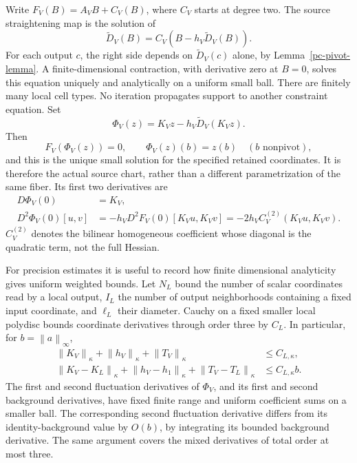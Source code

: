 \documentclass[11pt]{article}
\newcommand{\norm}[1]{\left\|#1\right\|}
\begin{document}
Write $F_V(B)=A_VB+C_V(B)$, where $C_V$ starts at degree two.
The source straightening map is the solution of
\begin{equation}\label{pc-straightening}
 \widetilde D_V(B)=C_V(B-h_V\widetilde D_V(B)).
\end{equation}
For each output $c$, the right side depends on
$\widetilde D_V(c)$ alone, by Lemma~\ref{pc-pivot-lemma}.
A finite-dimensional contraction, with derivative zero at
$B=0$, solves this equation uniquely and analytically on a
uniform small ball. There are finitely many local cell types.
No iteration propagates support to another constraint equation.
Set
\begin{equation}\label{pc-exact-chart}
 \Phi_V(z)=K_Vz-h_V\widetilde D_V(K_Vz).
\end{equation}
Then
\begin{equation}\label{pc-chart-identities}
 F_V(\Phi_V(z))=0,\qquad
 \Phi_V(z)(b)=z(b)\quad(b\text{ nonpivot}),
\end{equation}
and this is the unique small solution for the specified retained
coordinates. It is therefore the actual source chart, rather
than a different parametrization of the same fiber. Its first
two derivatives are
\begin{equation}\label{pc-chart-derivatives}
 \begin{split}
 D\Phi_V(0)&=K_V,\\
 D^2\Phi_V(0)[u,v]
   &=-h_VD^2F_V(0)[K_Vu,K_Vv]
    =-2h_VC_V^{(2)}(K_Vu,K_Vv).
 \end{split}
\end{equation}
$C_V^{(2)}$ denotes the bilinear homogeneous coefficient whose
diagonal is the quadratic term, not the full Hessian.

For precision estimates it is useful to record how finite
dimensional analyticity gives uniform weighted bounds. Let
$N_L$ bound the number of scalar coordinates read by a local
output, $I_L$ the number of output neighborhoods containing a
fixed input coordinate, and $\ell_L$ their diameter. Cauchy on a
fixed smaller local polydisc bounds coordinate derivatives
through order three by $C_L$. In particular, for
$b=\norm a_\infty$,
\begin{equation}\label{pc-local-operators}
 \begin{split}
 \norm{K_V}_\kappa+\norm{h_V}_\kappa+\norm{T_V}_\kappa
      &\le C_{L,\kappa},\\
 \norm{K_V-K_L}_\kappa+\norm{h_V-h_1}_\kappa
       +\norm{T_V-T_L}_\kappa&\le C_{L,\kappa}b.
 \end{split}
\end{equation}
The first and second fluctuation derivatives of $\Phi_V$,
and its first and second background derivatives, have fixed
finite range and uniform coefficient sums on a smaller ball.
The corresponding second fluctuation derivative differs from
its identity-background value by $O(b)$, by integrating its
bounded background derivative. The same argument covers the
mixed derivatives of total order at most three.
\end{document}

